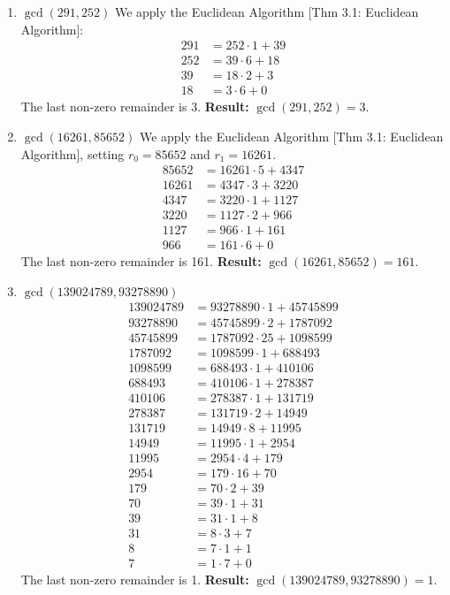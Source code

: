 \begin{enumerate}
    \item \textbf{$\gcd(291, 252)$}
    We apply the Euclidean Algorithm [Thm 3.1: Euclidean Algorithm]:
    \begin{align*}
        291 &= 252 \cdot 1 + 39 \\
        252 &= 39 \cdot 6 + 18 \\
        39 &= 18 \cdot 2 + 3 \\
        18 &= 3 \cdot 6 + 0
    \end{align*}
    The last non-zero remainder is 3.
    \textbf{Result:} $\gcd(291, 252) = 3$.

    \item \textbf{$\gcd(16261, 85652)$}
    We apply the Euclidean Algorithm [Thm 3.1: Euclidean Algorithm], setting $r_0 = 85652$ and $r_1 = 16261$.
    \begin{align*}
        85652 &= 16261 \cdot 5 + 4347 \\
        16261 &= 4347 \cdot 3 + 3220 \\
        4347 &= 3220 \cdot 1 + 1127 \\
        3220 &= 1127 \cdot 2 + 966 \\
        1127 &= 966 \cdot 1 + 161 \\
        966 &= 161 \cdot 6 + 0
    \end{align*}
    The last non-zero remainder is 161.
    \textbf{Result:} $\gcd(16261, 85652) = 161$.

    \item \textbf{$\gcd(139024789, 93278890)$}
    \begin{align*}
        139024789 &= 93278890 \cdot 1 + 45745899 \\
        93278890 &= 45745899 \cdot 2 + 1787092 \\
        45745899 &= 1787092 \cdot 25 + 1098599 \\
        1787092 &= 1098599 \cdot 1 + 688493 \\
        1098599 &= 688493 \cdot 1 + 410106 \\
        688493 &= 410106 \cdot 1 + 278387 \\
        410106 &= 278387 \cdot 1 + 131719 \\
        278387 &= 131719 \cdot 2 + 14949 \\
        131719 &= 14949 \cdot 8 + 11995 \\
        14949 &= 11995 \cdot 1 + 2954 \\
        11995 &= 2954 \cdot 4 + 179 \\
        2954 &= 179 \cdot 16 + 70 \\
        179 &= 70 \cdot 2 + 39 \\
        70 &= 39 \cdot 1 + 31 \\
        39 &= 31 \cdot 1 + 8 \\
        31 &= 8 \cdot 3 + 7 \\
        8 &= 7 \cdot 1 + 1 \\
        7 &= 1 \cdot 7 + 0
    \end{align*}
    The last non-zero remainder is 1.
    \textbf{Result:} $\gcd(139024789, 93278890) = 1$.


\end{enumerate}
